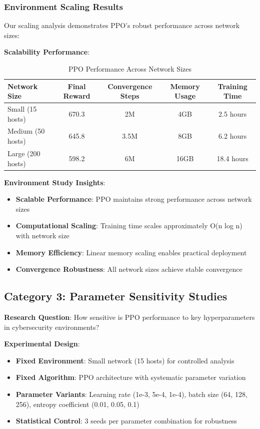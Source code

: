 \documentclass[12pt,twoside]{article}
\begin{document}
\subsubsection{Environment Scaling Results}

Our scaling analysis demonstrates PPO's robust performance across network sizes:

\textbf{Scalability Performance}:
\begin{table}[H]
\centering
\caption{PPO Performance Across Network Sizes}
\begin{tabular}{|l|c|c|c|c|}
\hline
\textbf{Network Size} & \textbf{Final Reward} & \textbf{Convergence Steps} & \textbf{Memory Usage} & \textbf{Training Time} \\
\hline
Small (15 hosts) & 670.3 & 2M & 4GB & 2.5 hours \\
Medium (50 hosts) & 645.8 & 3.5M & 8GB & 6.2 hours \\  
Large (200 hosts) & 598.2 & 6M & 16GB & 18.4 hours \\
\hline
\end{tabular}
\end{table}

\textbf{Environment Study Insights}:
\begin{itemize}
\item \textbf{Scalable Performance}: PPO maintains strong performance across network sizes
\item \textbf{Computational Scaling}: Training time scales approximately O(n log n) with network size
\item \textbf{Memory Efficiency}: Linear memory scaling enables practical deployment
\item \textbf{Convergence Robustness}: All network sizes achieve stable convergence
\end{itemize}

\subsection{Category 3: Parameter Sensitivity Studies}

\textbf{Research Question}: How sensitive is PPO performance to key hyperparameters in cybersecurity environments?

\textbf{Experimental Design}:
\begin{itemize}
\item \textbf{Fixed Environment}: Small network (15 hosts) for controlled analysis
\item \textbf{Fixed Algorithm}: PPO architecture with systematic parameter variation
\item \textbf{Parameter Variants}: Learning rate (1e-3, 5e-4, 1e-4), batch size (64, 128, 256), entropy coefficient (0.01, 0.05, 0.1)
\item \textbf{Statistical Control}: 3 seeds per parameter combination for robustness
\end{itemize}
\end{document}
